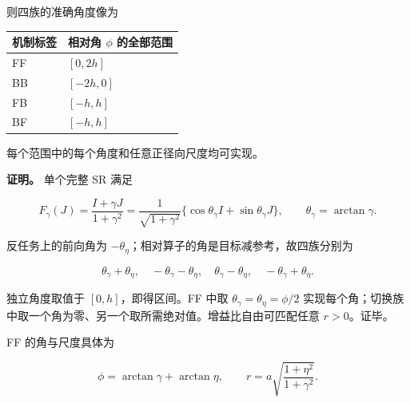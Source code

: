 \documentclass[11pt,a4paper]{article}
\begin{document}
则四族的准确角度像为


\begingroup
\small

\begin{longtable}[]{@{}ll@{}}
\toprule\noalign{}
机制标签 & 相对角 \(\phi\) 的全部范围 \\
\midrule\noalign{}
\endhead
\bottomrule\noalign{}
\endlastfoot
FF & \([0,2h]\) \\
BB & \([-2h,0]\) \\
FB & \([-h,h]\) \\
BF & \([-h,h]\) \\
\end{longtable}

\endgroup

每个范围中的每个角度和任意正径向尺度均可实现。

\par
\noindent\begin{minipage}{\linewidth}

\textbf{证明。} 单个完整 SR 满足

\[
F_\gamma(J)=\frac{I+\gamma J}{1+\gamma^2}
=\frac1{\sqrt{1+\gamma^2}}
\{\cos\theta_\gamma I+\sin\theta_\gamma J\},
\qquad\theta_\gamma=\arctan\gamma.
\]

\end{minipage}\par

\par
\noindent\begin{minipage}{\linewidth}

反任务上的前向角为
\(-\theta_\eta\)；相对算子的角是目标减参考，故四族分别为

\[
\theta_\gamma+\theta_\eta,\quad
-\theta_\gamma-\theta_\eta,\quad
\theta_\gamma-\theta_\eta,\quad
-\theta_\gamma+\theta_\eta.
\]

\end{minipage}\par

独立角度取值于 \([0,h]\)，即得区间。FF 中取
\(\theta_\gamma=\theta_\eta=\phi/2\)
实现每个角；切换族中取一个角为零、另一个取所需绝对值。增益比自由可匹配任意
\(r>0\)。证毕。

\par
\noindent\begin{minipage}{\linewidth}

FF 的角与尺度具体为

\[
\phi=\arctan\gamma+\arctan\eta,\qquad
r=a\sqrt{\frac{1+\eta^2}{1+\gamma^2}}.
\]

\end{minipage}\par
\end{document}
